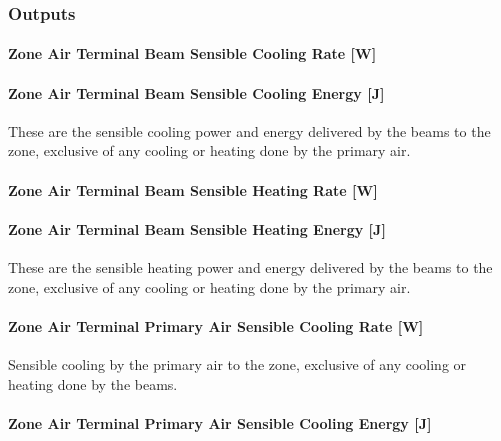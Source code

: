 \subsubsection{Outputs}\label{outputs-10}

\paragraph{Zone Air Terminal Beam Sensible Cooling Rate {[}W{]}}\label{zone-air-terminal-beam-sensible-cooling-rate-w}

\paragraph{Zone Air Terminal Beam Sensible Cooling Energy {[}J{]}}\label{zone-air-terminal-beam-sensible-cooling-energy-j}

These are the sensible cooling power and energy delivered by the beams to the zone, exclusive of any cooling or heating done by the primary air.

\paragraph{Zone Air Terminal Beam Sensible Heating Rate {[}W{]}}\label{zone-air-terminal-beam-sensible-heating-rate-w}

\paragraph{Zone Air Terminal Beam Sensible Heating Energy {[}J{]}}\label{zone-air-terminal-beam-sensible-heating-energy-j}

These are the sensible heating power and energy delivered by the beams to the zone, exclusive of any cooling or heating done by the primary air.

\paragraph{Zone Air Terminal Primary Air Sensible Cooling Rate {[}W{]}}\label{zone-air-terminal-primary-air-sensible-cooling-rate-w}

Sensible cooling by the primary air to the zone, exclusive of any cooling or heating done by the beams.

\paragraph{Zone Air Terminal Primary Air Sensible Cooling Energy {[}J{]}}\label{zone-air-terminal-primary-air-sensible-cooling-energy-j}

